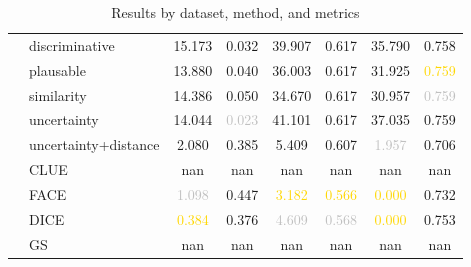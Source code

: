 \begin{table}[ht]
\begin{tabular}{l l c c c c c c}
 & discriminative & 15.173 & \textcolor{bronze}{0.032} & 39.907 & 0.617 & 35.790 & 0.758 \\
 & plausable & 13.880 & 0.040 & 36.003 & 0.617 & 31.925 & \textcolor{gold}{0.759} \\
 & similarity & 14.386 & 0.050 & 34.670 & 0.617 & \textcolor{bronze}{30.957} & \textcolor{silver}{0.759} \\
 & uncertainty & 14.044 & \textcolor{silver}{0.023} & 41.101 & 0.617 & 37.035 & \textcolor{bronze}{0.759} \\
 & uncertainty+distance & \textcolor{bronze}{2.080} & 0.385 & \textcolor{bronze}{5.409} & \textcolor{bronze}{0.607} & \textcolor{silver}{1.957} & 0.706 \\
 & CLUE & nan & nan & nan & nan & nan & nan \\
 & FACE & \textcolor{silver}{1.098} & 0.447 & \textcolor{gold}{3.182} & \textcolor{gold}{0.566} & \textcolor{gold}{0.000} & 0.732 \\
 & DICE & \textcolor{gold}{0.384} & 0.376 & \textcolor{silver}{4.609} & \textcolor{silver}{0.568} & \textcolor{gold}{0.000} & 0.753 \\
 & GS & nan & nan & nan & nan & nan & nan \\
\hline
\end{tabular}
\caption{Results by dataset, method, and metrics}
\label{tab:results}
\end{table}
